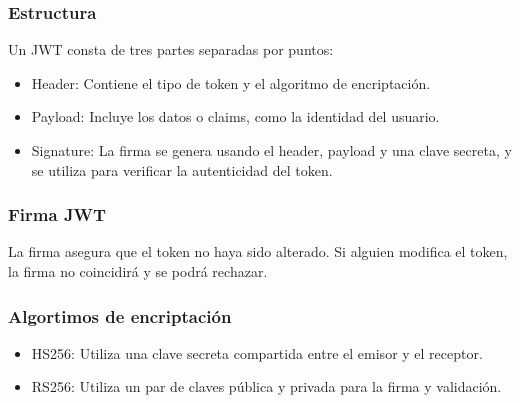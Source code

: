\begin{center}
    \subsubsection{Estructura}
    Un JWT consta de tres partes separadas por puntos:

    \begin{itemize}
        \item Header: Contiene el tipo de token y el algoritmo de encriptación.
        \item Payload: Incluye los datos o claims, como la identidad del usuario.
        \item Signature: La firma se genera usando el header, payload y una clave secreta, 
        y se utiliza para verificar la autenticidad del token.
    \end{itemize}

    \subsubsection{Firma JWT}
        La firma asegura que el token no haya sido alterado. Si alguien modifica el token, la firma no coincidirá y se podrá rechazar.
    \subsubsection{Algortimos de encriptación}
    \begin{itemize}
        \item HS256: Utiliza una clave secreta compartida entre el emisor y el receptor.
        \item RS256: Utiliza un par de claves pública y privada para la firma y validación.
    \end{itemize}


\end{center}